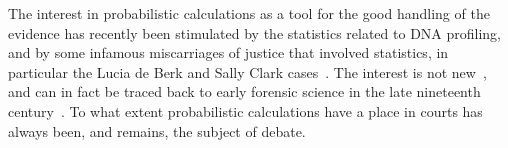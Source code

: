 \documentclass[10pt]{article}
\begin{document}
%
%
%



The interest in probabilistic calculations as a tool for the good handling of the evidence has recently been stimulated by the statistics related to DNA profiling, and by some infamous miscarriages of justice that involved statistics, in particular the Lucia de Berk and Sally Clark cases~\citep{dawidEtal2011,fenton2011,schnepsColmez2013}. The interest is not new~\citep{tillers2011}, and can in fact be traced back to early forensic science in the late nineteenth century~\citep{taroniEtal1998}. To what extent probabilistic calculations have a place in courts has always been, and remains, the subject of debate.

\end{document}
